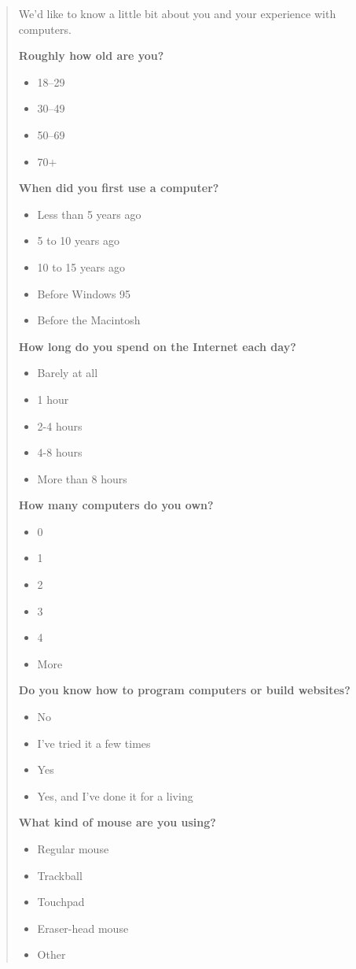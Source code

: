 \documentclass[conference]{IEEEtran}
\begin{document}
\begin{quote}
We'd like to know a little bit about you and your experience with
computers.

\textbf{Roughly how old are you?}
\begin{itemize}
\item 18--29
\item 30--49
\item 50--69
\item 70$+$
\end{itemize}

\textbf{When did you first use a computer?}
\begin{itemize}
\item Less than 5 years ago
\item 5 to 10 years ago
\item 10 to 15 years ago
\item Before Windows 95
\item Before the Macintosh
\end{itemize}

\textbf{How long do you spend on the Internet each day?}
\begin{itemize}
\item Barely at all
\item 1 hour
\item 2-4 hours
\item 4-8 hours
\item More than 8 hours
\end{itemize}

\textbf{How many computers do you own?}
\begin{itemize}
\item 0
\item 1
\item 2
\item 3
\item 4
\item More
\end{itemize}

\textbf{Do you know how to program computers or build websites?}
\begin{itemize}
\item No
\item I’ve tried it a few times
\item Yes
\item Yes, and I’ve done it for a living
\end{itemize}

\textbf{What kind of mouse are you using?}
\begin{itemize}
\item Regular mouse
\item Trackball
\item Touchpad
\item Eraser-head mouse
\item Other
\end{itemize}

\end{quote}

\CLASSOPTIONconferencefalse
\end{document}
